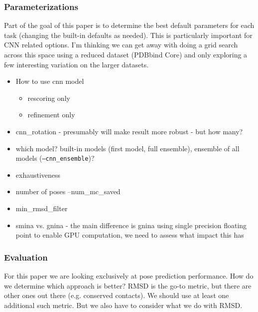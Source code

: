 \documentclass[journal=jcisd8,manuscript=article]{achemso}
\begin{document}
\subsubsection{Parameterizations}
Part of the goal of this paper is to determine the best default parameters for each task (changing the built-in defaults as needed).  This is particularly important for CNN related options.  I'm thinking we can get away with doing a grid search across this space using a reduced dataset (PDBbind Core) and only exploring a few interesting variation on the larger datasets.

\begin{itemize}
    \item How to use cnn model 
    \begin{itemize}
        \item rescoring only
        \item refinement only
    \end{itemize}
    \item cnn\_rotation - presumably will make result more robust - but how many?
    \item which model? built-in models (first model, full ensemble), ensemble of all models (\texttt{--cnn\_ensemble})?
  \item exhaustiveness
  \item number of poses  --num\_mc\_saved
  \item min\_rmsd\_filter
  \item smina vs. gnina - the main difference is gnina using single precision floating point to enable GPU computation, we need to assess what impact this has
\end{itemize}

\subsubsection{Evaluation}
For this paper we are looking exclusively at pose prediction performance. How do we determine which approach is better?  RMSD is the go-to metric, but there are other ones out there (e.g. conserved contacts).  We should use at least one additional such metric.  But we also have to consider what we do with RMSD.  
\end{document}
